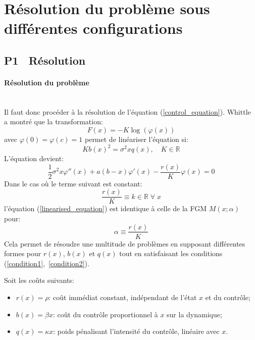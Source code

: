 \section{Résolution du problème sous différentes configurations}
\subsection{P1 \textemdash~Résolution}\label{p1}
\paragraph{Résolution du problème}\phantom{}\\
Il faut donc procéder à la résolution de l'équation (\ref{control_equation}). Whittle~\cite{whittle1982} a montré que la transformation: 
\[F(x)=-K\log(\varphi(x))\]
avec $\varphi(0)=\varphi(c)=1$ permet de linéariser l'équation si:
\begin{equation}\label{condition1}
    K{b(x)}^2=\sigma^2xq(x),\quad K\in\mathds{R}
\end{equation}
L'équation devient:
\begin{equation}\label{linearised_equation}
    \frac{1}{2}\sigma^2 x\varphi''(x) + a(b - x)\varphi'(x) - \frac{r(x)}{K}\varphi(x) = 0
\end{equation}
Dans le cas où le terme suivant est constant:
\begin{equation}\label{condition2}
    \frac{r(x)}{K}\equiv k\in\mathds{R}\;\forall\;x
\end{equation}
l'équation (\ref{linearised_equation}) est identique à celle de la \acl{FGM} $M(x;\alpha)$ pour:
\[
\alpha\equiv\frac{r(x)}{K}
\]
Cela permet de résoudre une multitude de problèmes en supposant différentes formes pour $r(x)$, $b(x)$ et $q(x)$ tout en satisfaisant les conditions (\ref{condition1},~\ref{condition2}). 

Soit les coûts suivants:
\begin{itemize}
    \item $r(x) = \rho$: coût immédiat constant, indépendant de l'état $x$ et du contrôle;
    \item $b(x) = \beta x$: coût du contrôle proportionnel à $x$ sur la dynamique;
    \item $q(x) = \kappa x$: poids pénalisant l'intensité du contrôle, linéaire avec $x$.
\end{itemize}

